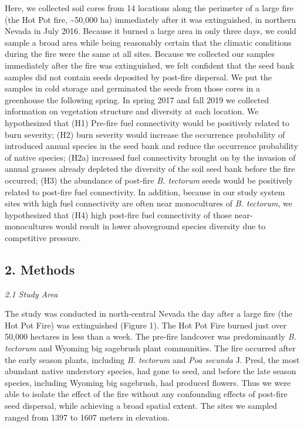 \documentclass[
  12pt,
]{article}
\begin{document}
Here, we collected soil cores from 14 locations along the perimeter of a
large fire (the Hot Pot fire, \textasciitilde50,000 ha) immediately
after it was extinguished, in northern Nevada in July 2016. Because it
burned a large area in only three days, we could sample a broad area
while being reasonably certain that the climatic conditions during the
fire were the same at all sites. Because we collected our samples
immediately after the fire was extinguished, we felt confident that the
seed bank samples did not contain seeds deposited by post-fire
dispersal. We put the samples in cold storage and germinated the seeds
from those cores in a greenhouse the following spring. In spring 2017
and fall 2019 we collected information on vegetation structure and
diversity at each location. We hypothesized that (H1) Pre-fire fuel
connectivity would be positively related to burn severity; (H2) burn
severity would increase the occurrence probability of introduced annual
species in the seed bank and reduce the occurrence probability of native
species; (H2a) increased fuel connectivity brought on by the invasion of
annual grasses already depleted the diversity of the soil seed bank
before the fire occurred; (H3) the abundance of post-fire \emph{B.
tectorum} seeds would be positively related to post-fire fuel
connectivity. In addition, because in our study system sites with high
fuel connectivity are often near monocultures of \emph{B. tectorum}, we
hypothesized that (H4) high post-fire fuel connectivity of those
near-monocultures would result in lower aboveground species diversity
due to competitive pressure.

\hypertarget{methods}{%
\subsection{2. Methods}\label{methods}}

\emph{2.1 Study Area}

The study was conducted in north-central Nevada the day after a large
fire (the Hot Pot Fire) was extinguished (Figure 1). The Hot Pot Fire
burned just over 50,000 hectares in less than a week. The pre-fire
landcover was predominantly \emph{B. tectorum} and Wyoming big sagebrush
plant communities. The fire occurred after the early season plants,
including \emph{B. tectorum} and \emph{Poa secunda} J. Presl, the most
abundant native understory species, had gone to seed, and before the
late season species, including Wyoming big sagebrush, had produced
flowers. Thus we were able to isolate the effect of the fire without any
confounding effects of post-fire seed dispersal, while achieving a broad
spatial extent. The sites we sampled ranged from 1397 to 1607 meters in
elevation.
\end{document}
